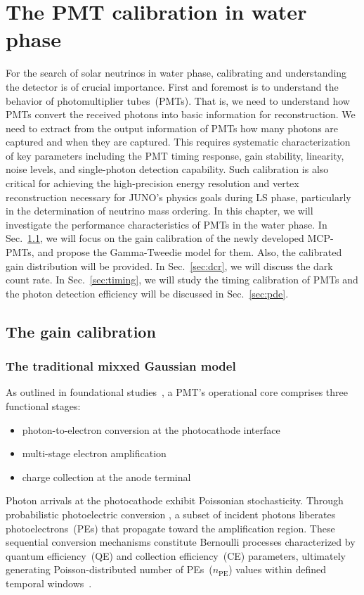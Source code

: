\chapter{The PMT calibration in water phase}\label{sec:Introduction}
For the search of solar neutrinos in water phase, calibrating and understanding the detector is of crucial importance. First and foremost is to understand the behavior of photomultiplier tubes~(PMTs). That is, we need to understand how PMTs convert the received photons into basic information for reconstruction. We need to extract from the output information of PMTs how many photons are captured and when they are captured. This requires systematic characterization of key parameters including the PMT timing response, gain stability, linearity, noise levels, and single-photon detection capability. Such calibration is also critical for achieving the high-precision energy resolution and vertex reconstruction necessary for JUNO's physics goals during LS phase, particularly in the determination of neutrino mass ordering. In this chapter, we will investigate the performance characteristics of PMTs in the water phase. In Sec.~\ref{sec:gaincalib}, we will focus on the gain calibration of the newly developed MCP-PMTs, and propose the Gamma-Tweedie model for them. Also, the calibrated gain distribution will be provided. In Sec.~\ref{sec:dcr}, we will discuss the dark count rate. In Sec.~\ref{sec:timing}, we will study the timing calibration of PMTs and the photon detection efficiency will be discussed in Sec.~\ref{sec:pde}.
\section{The gain calibration}
\label{sec:gaincalib}
\subsection{The traditional mixxed Gaussian model}
As outlined in foundational studies~\cite{1955Scintillation}, a PMT's operational core comprises three functional stages:
\begin{itemize}
	\item photon-to-electron conversion at the photocathode interface
	\item multi-stage electron amplification
	\item charge collection at the anode terminal
\end{itemize}

Photon arrivals at the photocathode exhibit Poissonian stochasticity. Through probabilistic photoelectric conversion \cite{2016Optimization}, a subset of incident photons liberates photoelectrons~(PEs) that propagate toward the amplification region. These sequential conversion mechanisms constitute Bernoulli processes characterized by quantum efficiency~(QE) and collection efficiency~(CE) parameters, ultimately generating Poisson-distributed number of PEs~($n_{\mathrm{PE}}$) values within defined temporal windows~\cite{1994Absolute}.

